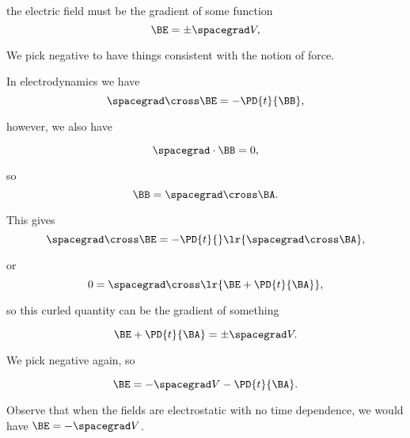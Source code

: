 the electric field must be the gradient of some function
\begin{dmath}\label{eqn:emtLecture10:740}
\BE = \pm \spacegrad V,
\end{dmath}

We pick negative to have things consistent with the notion of force.

In electrodynamics we have
\begin{dmath}\label{eqn:emtLecture10:760}
\spacegrad \cross \BE = - \PD{t}{\BB},
\end{dmath}

however, we also have

\begin{dmath}\label{eqn:emtLecture10:780}
\spacegrad \cdot \BB = 0,
\end{dmath}

so
\begin{dmath}\label{eqn:emtLecture10:800}
   \BB = \spacegrad \cross \BA.
\end{dmath}

This gives
\begin{dmath}\label{eqn:emtLecture10:820}
   \spacegrad \cross \BE = - \PD{t}{} \lr{ \spacegrad \cross \BA },
\end{dmath}

or
\begin{dmath}\label{eqn:emtLecture10:840}
0 =
\spacegrad \cross \lr{ \BE + \PD{t}{\BA} },
\end{dmath}

so this curled quantity can be the gradient of something

\begin{dmath}\label{eqn:emtLecture10:860}
\BE + \PD{t}{\BA} = \pm \spacegrad V.
\end{dmath}

We pick negative again, so

\begin{dmath}\label{eqn:emtLecture10:880}
\BE = -\spacegrad V -\PD{t}{\BA}.
\end{dmath}

Observe that when the fields are electrostatic with no time dependence, we would have \( \BE = -\spacegrad V \).


\EndNoBibArticle
